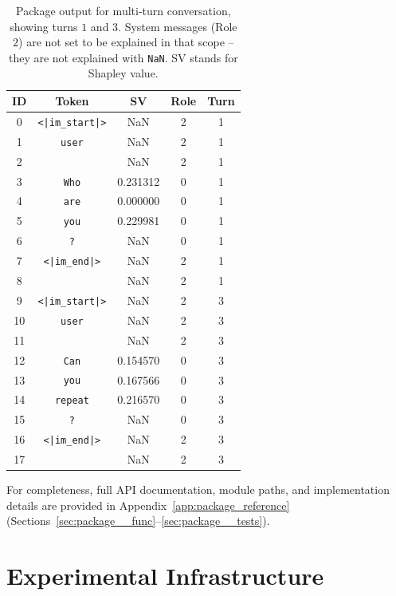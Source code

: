 \begin{table}[t!]
    \centering
    \caption{Package output for multi-turn conversation, showing turns $1$ and $3$. System messages (Role $2$) are not set to be explained in that scope -- they are not explained with \texttt{NaN}. SV stands for Shapley value.}
    \label{tab:package__align__example}
    \begin{tabular}{ccccc}
        \toprule
        \textbf{ID} & \textbf{Token} & \textbf{SV} & \textbf{Role} & \textbf{Turn} \\
        \midrule
        0 & \texttt{<|im\_start|>} & NaN & 2 & 1 \\
        1 & \texttt{user} & NaN & 2 & 1 \\
        2 & \text{ } & NaN & 2 & 1 \\
        3 & \texttt{Who} & 0.231312 & 0 & 1 \\
        4 & \texttt{are} & 0.000000 & 0 & 1 \\
        5 & \texttt{you} & 0.229981 & 0 & 1 \\
        6 & \texttt{?} & NaN & 0 & 1 \\
        7 & \texttt{<|im\_end|>} & NaN & 2 & 1 \\
        8 & \text{ } & NaN & 2 & 1 \\
        \midrule
        9 & \texttt{<|im\_start|>} & NaN & 2 & 3 \\
        10 & \texttt{user} & NaN & 2 & 3 \\
        11 & \text{ } & NaN & 2 & 3 \\
        12 & \texttt{Can} & 0.154570 & 0 & 3 \\
        13 & \texttt{you} & 0.167566 & 0 & 3 \\
        14 & \texttt{repeat} & 0.216570 & 0 & 3 \\
        15 & \texttt{?} & NaN & 0 & 3 \\
        16 & \texttt{<|im\_end|>} & NaN & 2 & 3 \\
        17 & \text{ } & NaN & 2 & 3 \\
        \bottomrule
    \end{tabular}
\end{table}

For completeness, full API documentation, module paths, and implementation details are provided in Appendix~\ref{app:package_reference} (Sections~\ref{sec:package__func}--\ref{sec:package__tests}).

\section{Experimental Infrastructure}
\label{sec:experiments__infrastructure}

